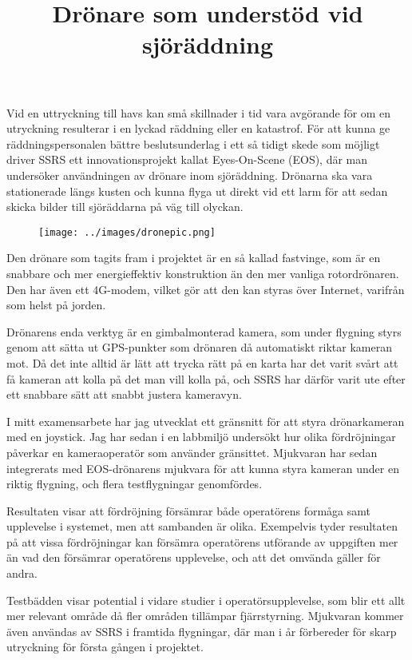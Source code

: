 \documentclass{popsci}
\title{Drönare som understöd vid sjöräddning}
\begin{document}

{\noindent Vid en uttryckning till havs kan små skillnader i tid vara avgörande för om en utryckning resulterar i en lyckad räddning eller en katastrof. För att kunna ge räddningspersonalen bättre beslutsunderlag i ett så tidigt skede som möjligt driver SSRS ett innovationsprojekt kallat Eyes-On-Scene (EOS), där man undersöker användningen av drönare inom sjöräddning. Drönarna ska vara stationerade längs kusten och kunna flyga ut direkt vid ett larm för att sedan skicka bilder till sjöräddarna på väg till olyckan.

\begin{figure}[!bth] %
    \texttt{[image: ../images/dronepic.png]} 
\end{figure}

Den drönare som tagits fram i projektet är en så kallad fastvinge, som är en snabbare och mer energieffektiv konstruktion än den mer vanliga rotordrönaren. Den har även ett 4G-modem, vilket gör att den kan styras över Internet, varifrån som helst på jorden. 

Drönarens enda verktyg är en gimbalmonterad kamera, som under flygning styrs genom att sätta ut GPS-punkter som drönaren då automatiskt riktar kameran mot. Då det inte alltid är lätt att trycka rätt på en karta har det varit svårt att få kameran att kolla på det man vill kolla på, och SSRS har därför varit ute efter ett snabbare sätt att snabbt justera kameravyn.

I mitt examensarbete har jag utvecklat ett gränsnitt för att styra drönarkameran med en joystick. Jag har sedan i en labbmiljö undersökt hur olika fördröjningar påverkar en kameraoperatör som använder gränsittet. Mjukvaran har sedan integrerats med EOS-drönarens mjukvara för att kunna styra kameran under en riktig flygning, och flera testflygningar genomfördes. 

Resultaten visar att fördröjning försämrar både operatörens formåga samt upplevelse i systemet, men att sambanden är olika. Exempelvis tyder resultaten på att vissa fördröjningar kan försämra operatörens utförande av uppgiften mer än vad den försämrar operatörens upplevelse, och att det omvända gäller för andra.  

Testbädden visar potential i vidare studier i operatörsupplevelse, som blir ett allt mer relevant område då fler områden tillämpar fjärrstyrning. Mjukvaran kommer även användas av SSRS i framtida flygningar, där man i år förbereder för skarp utryckning för första gången i projektet.
}
\end{document}
